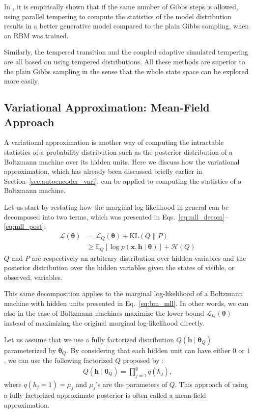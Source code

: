 \documentclass[dissertation,nocontribution,draft*]{aaltoseries}
\newcommand{\vect}[1]{\mathbf{#1}}
\newcommand{\vects}[1]{\boldsymbol{#1}}
\newcommand{\vh}[0]{\vect{h}}
\newcommand{\vx}[0]{\vect{x}}
\newcommand{\TT}[0]{{\vects{\theta}}}
\newcommand{\LL}[0]{\mathcal{L}}
\newcommand{\HH}[0]{\mathcal{H}}
\newcommand{\KL}[0]{\text{KL}}
\newcommand{\E}[0]{\mathbb{E}}
\begin{document}
In , it is empirically shown that if
the same number of Gibbs steps is allowed, using parallel
tempering to compute the statistics of the model
distribution results in a better generative model compared
to the plain Gibbs sampling, when an RBM was trained.

Similarly, the tempered transition and the
coupled adaptive simulated tempering
\citep{Salakhutdinov2010} are all based on using 
tempered distributions. All these methods are superior to
the plain Gibbs sampling in the sense that the whole state
space can be explored more easily.


\subsection{Variational Approximation: Mean-Field Approach}
\label{sec:bm_vari}

A variational approximation is another way of computing the
intractable statistics of a probability distribution such as
the posterior distribution of a Boltzmann machine over its
hidden units. Here we discuss how the variational
approximation, which has already been discussed briefly
earlier in Section~\ref{sec:autoencoder_vari}, can be
applied to computing the statistics of a Boltzmann machine.

Let us start by restating how the marginal log-likelihood in
general can be decomposed into two terms, which was
presented in Eqs.~\eqref{eq:mll_decom}--\eqref{eq:mll_post}:
\begin{align}
    \label{eq:bm_vari}
    \LL(\TT) &= \LL_Q(\TT) + \KL(Q \| P) 
    \nonumber
    \\
    &\geq 
    \E_{Q} \left[ \log p(\vx, \vh \mid
    \TT)\right] + \HH(Q)
\end{align}
$Q$ and $P$ are respectively an arbitrary distribution
over hidden variables and the posterior distribution over
the hidden variables given the states of visible, or
observed, variables.

This same decomposition applies to the marginal
log-likelihood of a Boltzmann machine with hidden units
presented in Eq.~\eqref{eq:bm_mll}. In other words, we can
also in the case of Boltzmann machines maximize the
lower bound $\LL_Q(\TT)$ instead of maximizing the original
marginal log-likelihood directly.

Let us assume that we use a fully factorized distribution
$Q(\vh \mid \TT_Q)$ parameterized by $\TT_Q$. By considering
that each hidden unit can have either $0$ or $1$, we can use
the following factorized $Q$ proposed by
\citet{Salakhutdinov2009}:
\begin{align}
    \label{eq:bm_fact_q}
    Q(\vh \mid \TT_Q) = \prod_{j=1}^q q(h_j),
\end{align}
where $q(h_j = 1) = \mu_j$ and $\mu_j$'s are the parameters
of $Q$. This approach of using a fully factorized
approximate posterior is often called a mean-field approximation.
\end{document}
